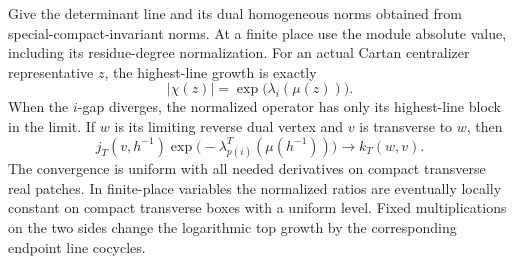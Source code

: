 \begin{lemma}\label{lem:heights-line-normalization}
Give the determinant line and its dual homogeneous norms obtained from
special-compact-invariant norms.  At a finite place use the module absolute
value, including its residue-degree normalization.  For an actual Cartan
centralizer representative $z$, the highest-line growth is exactly
\[
 |\chi(z)|=\exp\bigl(\lambda_i(\mu(z))\bigr).
\]
When the $i$-gap diverges, the normalized operator has only its highest-line
block in the limit.  If $w$ is its limiting reverse dual vertex and $v$ is
transverse to $w$, then
\begin{equation}\label{eq:input-14}
 j_T(v,h^{-1})\exp\bigl(-\lambda_{p(i)}^T(\mu(h^{-1}))\bigr)
 \longrightarrow k_T(w,v).
\end{equation}
The convergence is uniform with all needed derivatives on compact
transverse real patches.  In finite-place variables the normalized ratios
are eventually locally constant on compact transverse boxes with a uniform
level.  Fixed multiplications on the two sides change the logarithmic top
growth by the corresponding endpoint line cocycles.
\end{lemma}

